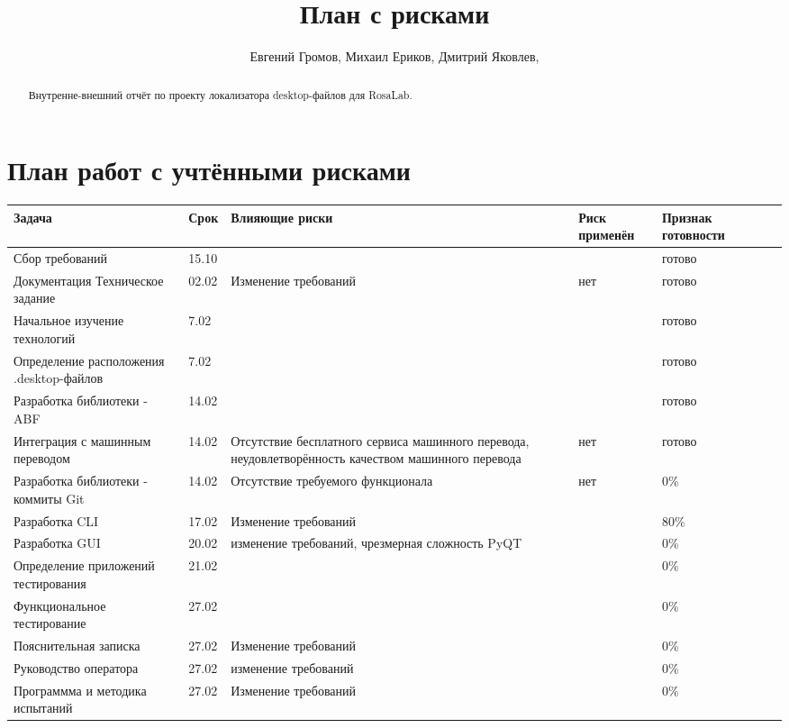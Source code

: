 \documentclass[12pt,a4paper]{report}
\author{Евгений Громов, Михаил Ериков, Дмитрий Яковлев,}
\title{План с рисками}
\begin{document}
	\maketitle
	\begin{abstract}
		Внутренне-внешний отчёт по проекту локализатора desktop-файлов для RosaLab.
	\end{abstract}
	\section{План работ с учтёнными рисками}
		\begin{tabular}{| p{4cm} | l | p{5cm} | l | p{4cm} | l | l |}
			\hline
	Задача & Срок & Влияющие риски & Риск применён & Признак готовности \\ \hline
	
	Сбор требований & 15.10 &  & & готово \\ \hline
	Документация Техническое задание & 02.02 & Изменение требований & нет & готово \\ \hline
	
	Начальное изучение технологий & 7.02 & & & готово \\ \hline
	Определение расположения .desktop-файлов & 7.02 & & & готово \\ \hline

	Разработка библиотеки - ABF & 14.02 & & & готово \\ \hline
	Интеграция с машинным переводом & 14.02 & Отсутствие бесплатного сервиса машинного перевода, неудовлетворённость качеством машинного перевода & нет & готово \\ \hline
		Разработка библиотеки - коммиты Git & 14.02 & Отсутствие требуемого функционала & нет & 0\% \\ \hline
	Разработка CLI & 17.02 & Изменение требований & & 80\% \\ \hline
	Разработка GUI & 20.02 & изменение требований, чрезмерная сложность PyQT & & 0\%  \\ \hline
	Определение приложений тестирования & 21.02 & & & 0\% \\ \hline
	Функциональное тестирование & 27.02 & & & 0\% \\ \hline
	Пояснительная записка &27.02 & Изменение требований & & 0\% \\ \hline
	Руководство оператора & 27.02 & изменение требований & & 0\% \\ \hline
	Программма и методика испытаний & 27.02 & Изменение требований & & 0\% \\ \hline
		\end{tabular}
\end{document}
